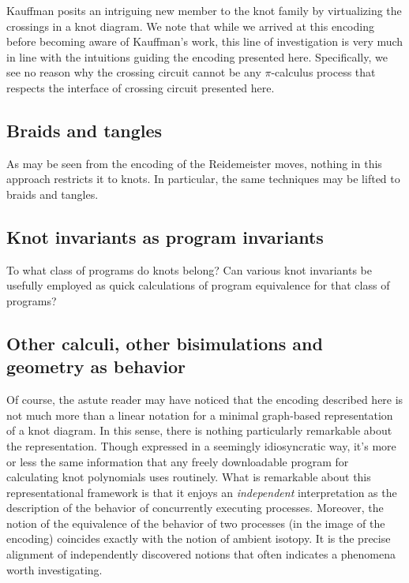 \documentclass[]{llncs}
\begin{document}
Kauffman posits an intriguing new member to the knot family by
virtualizing the crossings in a knot diagram. We note that while we
arrived at this encoding before becoming aware of Kauffman's work,
this line of investigation is very much in line with the intuitions
guiding the encoding presented here. Specifically, we see no reason
why the crossing circuit cannot be any $\pi$-calculus process that
respects the interface of crossing circuit presented here.

\subsection{Braids and tangles}

As may be seen from the encoding of the Reidemeister moves, nothing in
this approach restricts it to knots. In particular, the same
techniques may be lifted to braids and tangles.

\subsection{Knot invariants as program invariants}

To what class of programs do knots belong? Can various knot invariants
be usefully employed as quick calculations of program equivalence for
that class of programs?

\subsection{Other calculi, other bisimulations and geometry as behavior}

Of course, the astute reader may have noticed that the encoding
described here is not much more than a linear notation for a minimal
graph-based representation of a knot diagram. In this sense, there is
nothing particularly remarkable about the representation. Though
expressed in a seemingly idiosyncratic way, it's more or less the same
information that any freely downloadable program for calculating knot
polynomials uses routinely. What is remarkable about this
representational framework is that it enjoys an \emph{independent}
interpretation as the description of the behavior of concurrently
executing processes. Moreover, the notion of the equivalence of the
behavior of two processes (in the image of the encoding) coincides
exactly with the notion of ambient isotopy. It is the precise
alignment of independently discovered notions that often indicates a
phenomena worth investigating.
\end{document}
